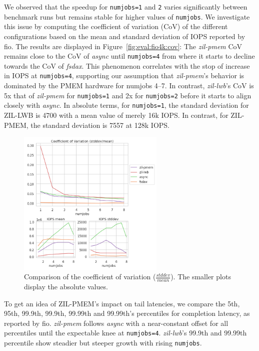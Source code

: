 \documentclass[12pt,a4paper,twoside]{book}
\begin{document}
We observed that the speedup for \lstinline{numjobs=1} and \lstinline{2} varies significantly between benchmark runs but remains stable for higher values of \lstinline{numjobs}.
We investigate this issue by computing the coefficient of variation (CoV) of the different configurations based on the mean and standard deviation of IOPS reported by fio.
The results are displayed in Figure~\ref{fig:eval:fio4k:cov}:
The \textit{zil-pmem} CoV remains close to the CoV of \textit{async} until \lstinline{numjobs=4} from where it starts to decline towards the CoV of \textit{fsdax}.
This phenomenon correlates with the stop of increase in IOPS at \lstinline{numjobs=4}, supporting our assumption that \textit{zil-pmem}'s behavior is dominated by the PMEM hardware for numjobs 4--7.
In contrast, \textit{zil-lwb}'s CoV is 5x that of \textit{zil-pmem} for \lstinline{numjobs=1} and 2x for \lstinline{numjobs=2} before it starts to align closely with \textit{async}.
In absolute terms, for \lstinline{numjobs=1}, the standard deviation for ZIL-LWB is 4700 with a mean value of merely 16k IOPS.
In contrast, for ZIL-PMEM, the standard deviation is 7557 at 128k IOPS.

\begin{figure}[H]
    \centering
    \includegraphics[height=7cm]{fig/evaluation/motivating_fio_benchmark__cov_comparison}
    \caption{Comparison of the coefficient of variation ($\frac{stddev}{mean}$). The smaller plots display the absolute values.}
\end{figure}

To get an idea of ZIL-PMEM's impact on tail latencies, we compare the 5th, 95th, 99.9th, 99.9th, 99.99th and 99.99th's percentiles for completion latency, as reported by fio.
\textit{zil-pmem} follows \textit{async} with a near-constant offset for all percentiles until the expectable knee at \lstinline{numjobs=4}.
\textit{zil-lwb}'s 99.9th and 99.99th percentile show steadier but steeper growth with rising \lstinline{numjobs}.
\end{document}
